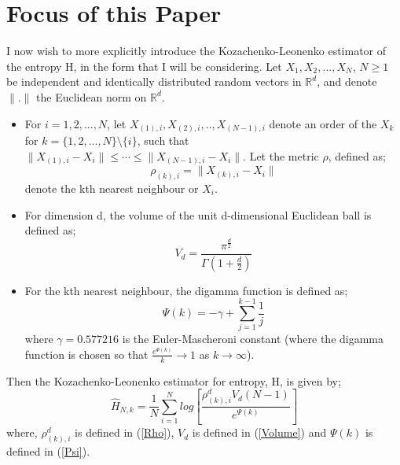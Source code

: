 \documentclass{report}
\begin{document}
\section{Focus of this Paper} \label{motivation}

I now wish to more explicitly introduce the Kozachenko-Leonenko estimator of the entropy H, in the form that I will be considering. Let $X_{1}, X_{2}, ... ,X_{N}$, $N \geq 1$ be independent and identically distributed random vectors in $\mathbb{R}^{d}$, and denote $\|.\|$ the Euclidean norm on $\mathbb{R}^{d}$.
 
\begin{itemize}

\item For $i = 1, 2, ..., N$, let $X_{(1), i}, X_{(2), i}, .., X_{(N-1), i}$ denote an order of the $X_{k}$ for $k = \{1, 2, ..., N\} \setminus \{i\}$, such that $\| X_{(1), i} - X_{i}\| \leq \cdots \leq \|  X_{(N-1), i} - X_{i}\| $. Let the metric $\rho$, defined as;
\begin{equation} \label{Rho}
\rho_{(k), i} = \| X_{(k), i} - X_{i}\|
\end{equation} denote the kth nearest neighbour or $X_{i}$.

\item  For dimension d, the volume of the unit d-dimensional Euclidean ball is defined as;
\begin{equation} \label{Volume}
V_{d} = \frac{\pi^\frac{d}{2}}{\Gamma(1 + \frac{d}{2})}
\end{equation}

\item For the kth nearest neighbour, the digamma function is defined as;
\begin{equation} \label{Psi}
\Psi(k) = -\gamma + \sum_{j=1}^{k-1} \frac{1}{j}
\end{equation}
where $\gamma = 0.577216$ is the Euler-Mascheroni constant (where the digamma function is chosen so that $\frac{e^{\Psi(k)}}{k}\to1$ as $k \to \infty$).

\end{itemize} Then the Kozachenko-Leonenko estimator for entropy, H, is given by;
\begin{equation} \label{KLest}
\hat{H}_{N, k} = \frac{1}{N} \sum_{i=1}^{N} log \left[ \frac{\rho_{(k),i}^{d} V_{d} (N-1)}{e^{\Psi(k)}} \right]
\end{equation} where, $\rho_{(k),i}^{d}$ is defined in (\ref{Rho}), $V_{d}$ is defined in (\ref{Volume}) and $\Psi(k)$ is defined in (\ref{Psi}). 
\end{document}
